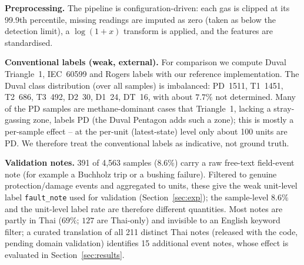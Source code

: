 \textbf{Preprocessing.}
The pipeline is configuration-driven: each gas is clipped at its 99.9th percentile, missing
readings are imputed as zero (taken as below the detection limit), a $\log(1+x)$ transform
is applied, and the features are standardised.

\textbf{Conventional labels (weak, external).}
For comparison we compute Duval Triangle~1, IEC~60599 and Rogers labels with our reference
implementation. The Duval class distribution (over all samples) is imbalanced: PD~1511, T1~1451,
T2~686, T3~492, D2~30, D1~24, DT~16, with about $7.7\%$ not determined. Many of the PD samples are
methane-dominant cases that Triangle~1, lacking a stray-gassing zone, labels PD (the Duval Pentagon
adds such a zone); this is mostly a per-sample effect -- at the per-unit (latest-state) level only
about 100 units are PD. We therefore treat the conventional labels as indicative, not ground truth.

\textbf{Validation notes.}
391 of 4{,}563 samples ($8.6\%$) carry a raw free-text field-event note (for example a Buchholz
trip or a bushing failure). Filtered to genuine protection/damage events and aggregated to units,
these give the weak unit-level label \texttt{fault\_note} used for validation (Section~\ref{sec:exp}); the
sample-level $8.6\%$ and the unit-level label rate are therefore different quantities. Most
notes are partly in Thai ($69\%$; $127$ are Thai-only) and invisible to an English keyword
filter; a curated translation of all 211 distinct Thai notes (released with the code, pending
domain validation) identifies 15 additional event notes, whose effect is evaluated in
Section~\ref{sec:results}.

